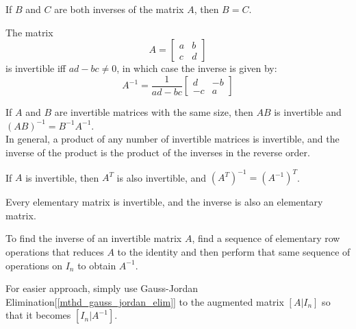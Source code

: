 \documentclass{report}
\begin{document}
		\begin{thm}
			If $B$ and $C$ are both inverses of the matrix $A$, then $B=C$.
		\end{thm}
		
		\begin{thm}\label{thm_inv_2_by_2}
			The matrix
			\begin{displaymath}
				A=
				\begin{bmatrix}
					a & b \\ c & d
				\end{bmatrix}
			\end{displaymath}
			is invertible iff $ad-bc\ne0$, in which case the inverse is given by:
			\begin{displaymath}
				A^{-1}=\frac{1}{ad-bc}
				\begin{bmatrix}
					d & -b \\ -c & a
				\end{bmatrix}
			\end{displaymath}
		\end{thm}
		
		\begin{thm}
			If $A$ and $B$ are invertible matrices with the same size, then $AB$ is invertible and $(AB)^{-1}=B^{-1}A^{-1}$.\\
			In general, a product of any number of invertible matrices is invertible, and the inverse of the product is the product of the inverses in the reverse order.
		\end{thm}
		
		\begin{thm}
			If $A$ is invertible, then $A^T$ is also invertible, and $(A^T)^{-1}=(A^{-1})^T$.
		\end{thm}
		
		\begin{thm}
			Every elementary matrix is invertible, and the inverse is also an elementary matrix.
		\end{thm}
		
		\begin{mthd}
			To find the inverse of an invertible matrix $A$, find a sequence of elementary row operations that reduces $A$ to the identity and then perform that same sequence of operations on $I_n$ to obtain $A^{-1}$.
			
			For easier approach, simply use Gauss-Jordan Elimination[\ref{mthd_gauss_jordan_elim}] to the augmented matrix $\left[A|I_n\right]$ so that it becomes $\left[I_n|A^{-1}\right]$.
		\end{mthd}
	
\end{document}
